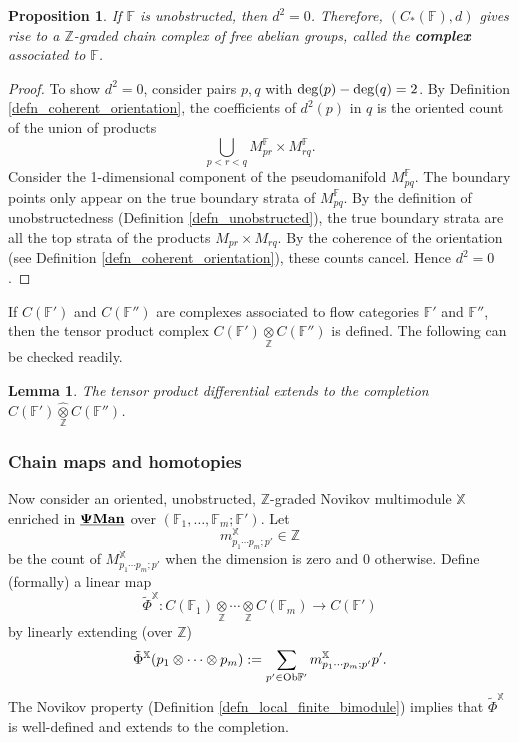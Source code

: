 \documentclass[reqno, 10pt]{amsart}
\numberwithin{equation}{section}
\numberwithin{equation}{section}
\newtheorem{prop}[thm]{Proposition}
\newtheorem{lemma}[thm]{Lemma}
\theoremstyle{definition}
\theoremstyle{remark}
\newcommand{\beq}{\begin{equation}}
\newcommand{\eeq}{\end{equation}}
\newcommand{\beqn}{\begin{equation*}}
\newcommand{\eeqn}{\end{equation*}}
\newcommand{\mb}{\mathbb}
\newcommand{\pman}{\uds{{\bf \Psi}{\bf Man}}}
\newcommand{\uds}[1]{\underline{\smash{#1}}}
\begin{document}
\begin{prop}\label{prop_differential}
If ${\mb F}$ is unobstructed, then $d^2 = 0$. Therefore, $(C_*({\mb F}), d)$ gives rise to a ${\mb Z}$-graded chain complex of free abelian groups, called the {\bf complex} associated to ${\mb F}$.
\end{prop}

\begin{proof}
To show $d^2 = 0$, consider pairs $p, q$ with ${\rm deg} (p) - {\rm deg}(q) = 2$. By Definition \ref{defn_coherent_orientation}, the coefficients of $d^2(p)$ in $q$ is the oriented count of the union of products
\beqn
\bigcup_{p < r < q} M_{pr}^{\mb F} \times M_{rq}^{\mb F}.
\eeqn
Consider the 1-dimensional component of the pseudomanifold $M_{pq}^{\mb F}$. The boundary points only appear on the true boundary strata of $M_{pq}^{\mb F}$. By the definition of unobstructedness (Definition \ref{defn_unobstructed}), the true boundary strata are all the top strata of the products $M_{pr}\times M_{rq}$. By the coherence of the orientation (see Definition \ref{defn_coherent_orientation}), these counts cancel. Hence $d^2 = 0$. 
\end{proof}

If $C({\mb F}')$ and $C({\mb F}'')$ are complexes associated to flow categories ${\mb F}'$ and ${\mb F}''$, then the tensor product complex $C({\mb F}') \underset{\mb Z}{\otimes} C({\mb F}'')$ is defined. The following can be checked readily.

\begin{lemma}
The tensor product differential extends to the completion $\displaystyle 
C ({\mb F}') \widehat{\underset{\mb Z}{\otimes}} C ({\mb F}'')$.
\end{lemma}


\subsubsection{Chain maps and homotopies}

Now consider an oriented, unobstructed, ${\mb Z}$-graded Novikov multimodule ${\mb X}$ enriched in $\pman$ over $({\mb F}_1, \ldots, {\mb F}_m; {\mb F}')$. Let 
\beqn
m_{p_1 \cdots p_m; p'}^{\mb X} \in {\mb Z}
\eeqn
be the count of $M_{p_1 \cdots p_m; p'}^{{\mb X}}$ when the dimension is zero and $0$ otherwise. Define (formally) a linear map 
\beqn
\tilde \Phi^{\mb X}: C ({\mb F}_1) {\underset{{\mb Z}}{\otimes}} \cdots {\underset{{\mb Z}}{\otimes}} C ({\mb F}_m) \to C ({\mb F}')
\eeqn
by linearly extending (over ${\mb Z}$)
\beq\label{chain_map_sign}
\tilde \Phi^{\mb X} (p_1 \otimes \cdots \otimes p_m):= \sum_{p'\in {\rm Ob}{\mb F}'}  m_{p_1 \cdots p_m; p'}^{\mb X} p'.
\eeq
The Novikov property (Definition \ref{defn_local_finite_bimodule}) implies that $\tilde \Phi^{\mb X}$ is well-defined and extends to the completion.
\end{document}
